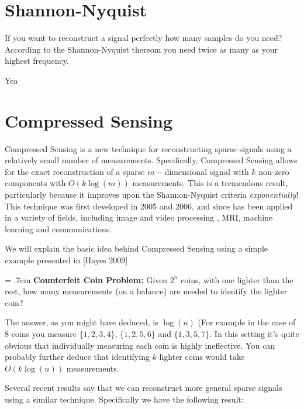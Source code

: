 \label{Ch:CS}


\section*{Shannon-Nyquist}

If you want to reconstruct a signal perfectly how many samples do you need? According to the  Shannon-Nyquist thereom you need twice as many as your highest frequency.


\begin{problem}
Yea
\end{problem}


\section*{Compressed Sensing}


Compressed Sensing is a new technique for reconstructing sparse signals using a relatively small number of measurements. Specifically, Compressed Sensing allows for the exact reconstruction of a sparse $m-$dimensional signal with $k$ non-zero components with $O(k \log (m))$ measurements. This is a tremendous result, particularly because it improves upon the Shannon-Nyquist criteria \emph{exponentially}! This technique was first developed in 2005 and 2006, and since has been applied in a variety of fields, including image and video processing , MRI, machine learning and communications.

We will explain the basic idea behind Compressed Sensing using a simple example presented in [Hayes 2009]


\hangindent = .7cm
\setlength{\parindent}{.7cm}
\textbf{Counterfeit Coin Problem:} Given $2^n$ coins, with one lighter than the rest, how many measurements (on a balance) are needed to identify the lighter coin?
\setlength{\parindent}{0cm}

The answer, as you might have deduced, is $\log(n)$ (For example in the case of 8 coins you measure $\{1,2,3,4\}$, $\{1,2,5,6\}$ and $\{1,3,5,7\}$. In this setting it's quite obvious that individually measuring each coin is highly ineffective. You can probably further deduce that identifying $k$ lighter coins would take $O(k \log(n))$ measurements.

Several recent results say that we can reconstruct more general sparse signals using a similar technique. Specifically we have the following result:

